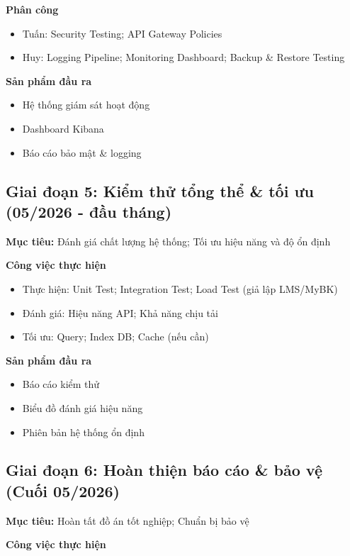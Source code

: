 \textbf{Phân công}

\begin{itemize}
    \item Tuấn: Security Testing; API Gateway Policies
    \item Huy: Logging Pipeline; Monitoring Dashboard; Backup \& Restore Testing
\end{itemize}


\textbf{Sản phẩm đầu ra}
\begin{itemize}
    \item Hệ thống giám sát hoạt động
    \item Dashboard Kibana
    \item Báo cáo bảo mật \& logging
\end{itemize}


\subsection{Giai đoạn 5: Kiểm thử tổng thể \& tối ưu (05/2026 - đầu tháng)}

\textbf{Mục tiêu:} Đánh giá chất lượng hệ thống; Tối ưu hiệu năng và độ ổn định

\textbf{Công việc thực hiện}

\begin{itemize}
    \item Thực hiện: Unit Test; Integration Test; Load Test (giả lập LMS/MyBK)
    \item Đánh giá: Hiệu năng API; Khả năng chịu tải
    \item Tối ưu: Query; Index DB; Cache (nếu cần)
\end{itemize}

\textbf{Sản phẩm đầu ra}

\begin{itemize}
    \item Báo cáo kiểm thử
    \item Biểu đồ đánh giá hiệu năng
    \item Phiên bản hệ thống ổn định
\end{itemize}


\subsection{Giai đoạn 6: Hoàn thiện báo cáo \& bảo vệ (Cuối 05/2026)}

\textbf{Mục tiêu:} Hoàn tất đồ án tốt nghiệp; Chuẩn bị bảo vệ

\textbf{Công việc thực hiện}

